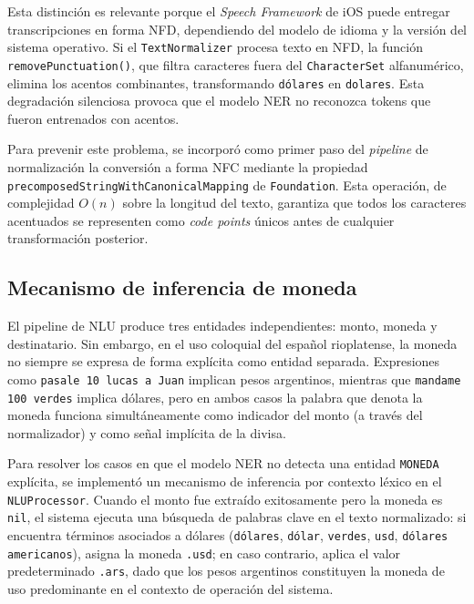 Esta distinción es relevante porque el \textit{Speech Framework} de iOS puede entregar transcripciones en forma NFD, dependiendo del modelo de idioma y la versión del sistema operativo. Si el \texttt{Text\-Normalizer} procesa texto en NFD, la función \texttt{remove\-Punctuation()}, que filtra caracteres fuera del \texttt{CharacterSet} alfanumérico, elimina los acentos combinantes, transformando \texttt{dólares} en \texttt{dolares}. Esta degradación silenciosa provoca que el modelo NER no reconozca tokens que fueron entrenados con acentos.

Para prevenir este problema, se incorporó como primer paso del \textit{pipeline} de normalización la conversión a forma NFC mediante la propiedad \texttt{precomposed\-String\-With\-Canonical\-Mapping} de \texttt{Foundation}. Esta operación, de complejidad $O(n)$ sobre la longitud del texto, garantiza que todos los caracteres acentuados se representen como \textit{code points} únicos antes de cualquier transformación posterior.

\subsection{Mecanismo de inferencia de moneda}
\label{subsec:fallback-moneda}

El pipeline de NLU produce tres entidades independientes: monto, moneda y destinatario. Sin embargo, en el uso coloquial del español rioplatense, la moneda no siempre se expresa de forma explícita como entidad separada. Expresiones como \texttt{pasale 10 lucas a Juan} implican pesos argentinos, mientras que \texttt{mandame 100 verdes} implica dólares, pero en ambos casos la palabra que denota la moneda funciona simultáneamente como indicador del monto (a través del normalizador) y como señal implícita de la divisa.

Para resolver los casos en que el modelo NER no detecta una entidad \texttt{MONEDA} explícita, se implementó un mecanismo de inferencia por contexto léxico en el \texttt{NLU\-Processor}. Cuando el monto fue extraído exitosamente pero la moneda es \texttt{nil}, el sistema ejecuta una búsqueda de palabras clave en el texto normalizado: si encuentra términos asociados a dólares (\texttt{dólares}, \texttt{dólar}, \texttt{verdes}, \texttt{usd}, \texttt{dólares americanos}), asigna la moneda \texttt{.usd}; en caso contrario, aplica el valor predeterminado \texttt{.ars}, dado que los pesos argentinos constituyen la moneda de uso predominante en el contexto de operación del sistema.

